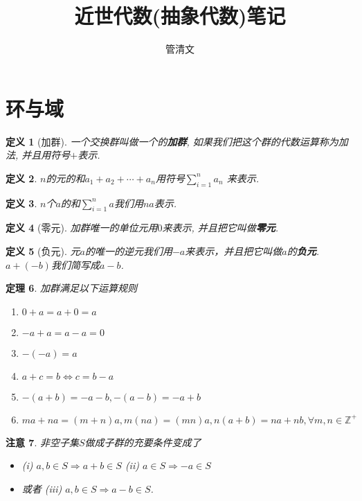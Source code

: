 \documentclass[UTF8]{ctexart}
\newtheorem{Definition}{定义}%
\newtheorem{Theorem}[Definition]{定理}
\newtheorem{Remark}[Definition]{注意}
\begin{document}
\title{近世代数(抽象代数)笔记}
\author{管清文}
\maketitle
\tableofcontents
\clearpage




\section{环与域}

\begin{Definition}[加群]
一个交换群叫做一个的\textbf{加群}, 如果我们把这个群的代数运算称为加法, 并且用符号$+$表示.
\end{Definition}

\begin{Definition}
$n$的元的和$a_1 + a_2 + \cdots + a_n$用符号$\displaystyle \sum_{i=1}^{n} a_n$ 来表示.
\end{Definition}

\begin{Definition}
$n$个$a$的和$\displaystyle \sum_{i=1}^{n} a$我们用$na$表示.
\end{Definition}

\begin{Definition}[零元]
加群唯一的单位元用$0$来表示, 并且把它叫做\textbf{零元}.
\end{Definition}

\begin{Definition}[负元]
元$a$的唯一的逆元我们用$-a$来表示，并且把它叫做$a$的\textbf{负元}. $a + (-b)$我们简写成$a - b$.
\end{Definition}

\begin{Theorem}
加群满足以下运算规则
\begin{enumerate}[(1)]
\item $0 + a = a + 0 = a$
\item $-a + a = a - a = 0$
\item $-(-a) = a$
\item[(4: 移项)] $a + c = b \Leftrightarrow c = b - a$
\item $-(a +b) = -a - b, -(a-b) = -a +b$
\item $ma + na = (m+n)a, m(na) = (mn)a, n(a+b) = na + nb, \forall m, n \in \mathbb{Z}^+$
\end{enumerate}
\end{Theorem}

\begin{Remark}
非空子集$S$做成子群的充要条件变成了 
\begin{itemize}
\item (i) $a, b \in S \Rightarrow a+b \in S$ (ii) $a \in S \Rightarrow -a \in S$
\item 或者 (iii) $a, b \in S \Rightarrow a - b \in S$.
\end{itemize}
\end{Remark}
\end{document}
